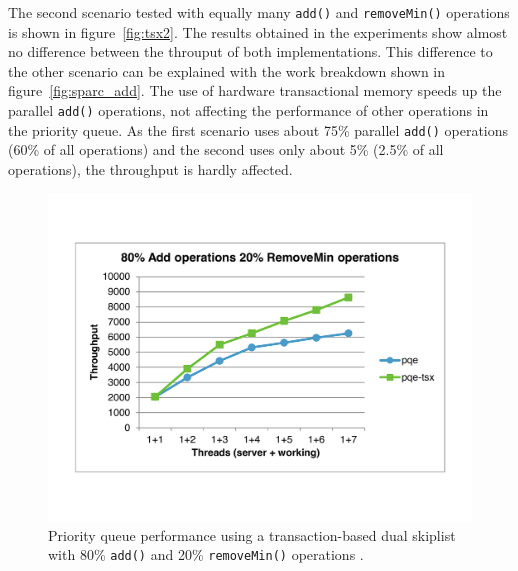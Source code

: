 The second scenario tested with equally many \texttt{add()} and \texttt{removeMin()} operations is shown in figure~\ref{fig:tsx2}. The results obtained in the experiments show almost no difference between the throuput of both implementations. This difference to the other scenario can be explained with the work breakdown shown in figure~\ref{fig:sparc_add}. The use of hardware transactional memory speeds up the parallel \texttt{add()} operations, not affecting the performance of other operations in the priority queue. As the first scenario uses about 75\% parallel \texttt{add()} operations (60\% of all operations) and the second uses only about 5\% (2.5\% of all operations), the throughput is hardly affected. 
\begin{figure}[htb]
	\centering
	\begin{minipage}{.495\textwidth}
		\centering
		\includegraphics[width=\linewidth]{graphics/tsx-80-20.pdf}
		\caption{Priority queue performance using a transaction-based dual skiplist with 80\% \texttt{add()} and 20\% \texttt{removeMin()} operations \cite{calciu_adaptive_2014}.}
		\label{fig:tsx1}
	\end{minipage}%
	\hfill%
	\begin{minipage}{.495\textwidth}
		\centering

\end{minipage}
\end{figure}
